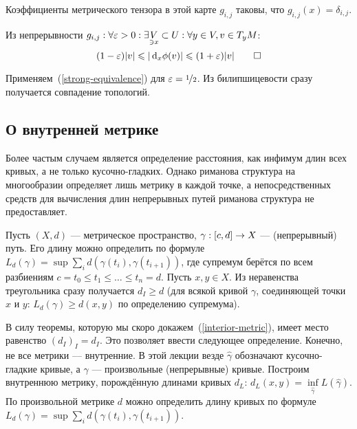 \documentclass[a4paper]{report}
\begin{document}
{{{{        Коэффициенты метрического тензора в этой карте $g_{i,j}$ таковы, что $g_{i,j}(x) = \delta_{i,j}$.

        Из непрерывности $g_{i,j}: \forall \varepsilon > 0:\exists \underset{\ni x}V \subset U: \forall y \in V, v \in T_y M$: \[(1 - \varepsilon)|v| \leqslant |\operatorname{d}\!_x\phi(v)| \leqslant (1 + \varepsilon)|v|\qedhere\]

    }
    }
    \item Применяем~(\cref{strong-equivalence}) для $\varepsilon = \nicefrac{1}{2}$.
        Из билипшицевости сразу получается совпадение топологий.
    }
    }
    \subsection{О внутренней метрике}
    Более частым случаем является определение расстояния, как инфимум длин всех кривых, а не только кусочно-гладких.
    Однако риманова структура на многообразии определяет лишь метрику в каждой точке, а непосредственных средств для вычисления длин непрерывных путей риманова структура не предоставляет.

    Пусть $(X, d)$ --- метрическое пространство, $\gamma: [c, d] \rightarrow X$ --- (непрерывный) путь.
    Его длину можно определить по формуле $L_d(\gamma) = \sup\sum\limits_{i}d(\gamma(t_i), \gamma(t_{i+1}))$, где супремум берётся по всем разбиениям $c = t_0 \le t_1 \le \dots \le t_n = d$.
    Пусть $x, y \in X$.
    Из неравенства треугольника сразу получается $d_I \ge d$ (для всякой кривой $\gamma$, соединяющей точки $x$ и $y$: $L_d(\gamma) \ge d(x, y)$ по определению супремума).

    В силу теоремы, которую мы скоро докажем~(\cref{interior-metric}), имеет место равенство $(d_I)_I = d_I$.
    Это позволяет ввести следующее определение.
    Конечно, не все метрики --- внутренние.
    В этой лекции везде $\hat{\gamma}$ обозначают кусочно-гладкие кривые, а $\gamma$ --- произвольные (непрерывные) кривые.
    Построим внутреннюю метрику, порождённую длинами кривых $d_L$: $d_L(x, y) = \inf\limits_{\hat{\gamma}}L(\hat{\gamma})$.
    По произвольной метрике $d$ можно определить длину кривых по формуле $L_d(\gamma) = \sup\sum\limits_{i}d(\gamma(t_i), \gamma(t_{i+1}))$.
\end{document}
